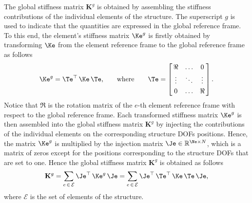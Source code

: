 The global stiffness matrix $\mathbf{K}^{g}$ is obtained by assembling the stiffness contributions of the individual elements of the structure. The superscript $g$ is used to indicate that the quantities are expressed in the global reference frame. To this end, the element's stiffness matrix $\Ke^{g}$ is firstly obtained by transforming $\Ke$ from the element reference frame to the global reference frame as follows
%
\begin{equation}
  \label{chap7:eq:element_stiffness_matrix}
  \Ke^{g} = \Te^\top \, \Ke \, \Te \text{,} \qquad \text{where} \qquad \Te = \left[\,\begin{matrix}
    \Re    & \ldots & 0 \\[0.25em]
    \vdots & \ddots & \vdots \\[0.25em]
    0      & \ldots & \Re
  \end{matrix}\,\right] \text{.}
\end{equation}
%
Notice that $\Re$ is the rotation matrix of the $e$-th element reference frame with respect to the global reference frame. Each transformed stiffness matrix $\Ke^{g}$ is then assembled into the global stiffness matrix $\mathbf{K}^{g}$ by injecting the contributions of the individual elements on the corresponding structure \acp{DOF} positions. Hence, the matrix $\Ke^{g}$ is multiplied by the injection matrix $\Je \in \mathbb{R}^{\Ne \times N}$, which is a matrix of zeros except for the positions corresponding to the structure \acp{DOF} that are set to one. Hence the global stiffness matrix $\mathbf{K}^{g}$ is obtained as follows
%
\begin{equation}
  \mathbf{K}^{g} = \sum_{e \, \in \, \mathcal{E}} \Je^\top \, \Ke^{g} \, \Je
   = \sum_{e \, \in \, \mathcal{E}} \Je^\top \, \Te^\top\,\Ke \, \Te \, \Je \text{,}
\end{equation}
%
where $\mathcal{E}$ is the set of elements of the structure.

